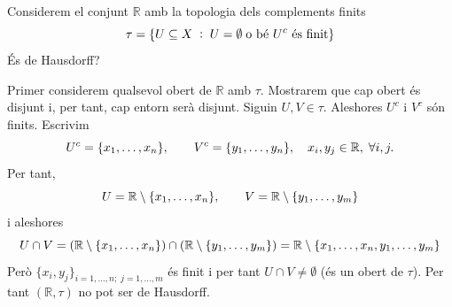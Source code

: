 \documentclass[../main.tex]{subfiles}
\begin{document}
\begin{ej}
\label{ej:hausdorff7} Considerem el conjunt $\mathbb{R}$ amb la topologia dels complements finits 
\begin{equation}
    \notag
    \tau = \{U\subseteq X\;:\;U = \emptyset\;\text{o bé $U^c$ és finit}\}
\end{equation}
És de Hausdorff?

Primer considerem qualsevol obert de $\mathbb{R}$ amb $\tau$. Mostrarem que cap obert és disjunt i, per tant, cap entorn serà disjunt. Siguin $U,V\in\tau$. Aleshores $U^c$ i $V^c$ són finits. Escrivim
\begin{equation}
    \notag
    U^c = \{x_1,\ldots,x_n\},\qquad V^c = \{y_1,\ldots,y_n\},\quad x_i,y_j\in\mathbb{R},\;\forall i,j.
\end{equation}
Per tant, 
\begin{equation}
    \notag
    U = \mathbb{R}\setminus\{x_1,\ldots,x_n\},\qquad V = \mathbb{R}\setminus\{y_1,\ldots,y_m\}
\end{equation}
i aleshores
\begin{equation}
    \notag
    U\cap V = (\mathbb{R}\setminus\{x_1,\ldots,x_n\})\cap (\mathbb{R}\setminus\{y_1,\ldots,y_m\}) = \mathbb{R}\setminus\{x_1,\ldots,x_n,y_1,\ldots,y_m\}
\end{equation}
Però $\{x_i,y_j\}_{i=1,\ldots,n;\;j=1,\ldots,m}$ és finit i per tant $U\cap V\not=\emptyset$ (és un obert de $\tau$). Per tant $(\mathbb{R},\tau)$ no pot ser de Hausdorff.
\end{ej}
\end{document}
